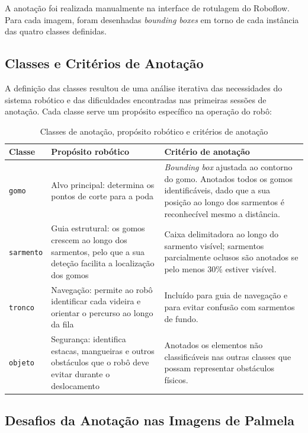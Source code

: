 A anotação foi realizada manualmente na interface de rotulagem do Roboflow.
Para cada imagem, foram desenhadas \textit{bounding boxes} em torno de cada
instância das quatro classes definidas.

\subsection{Classes e Critérios de Anotação}

A definição das classes resultou de uma análise iterativa das necessidades
do sistema robótico e das dificuldades encontradas nas primeiras sessões de
anotação. Cada classe serve um propósito específico na operação do robô:

\begin{table}[H]
  \centering
  \caption{Classes de anotação, propósito robótico e critérios de anotação}
  \label{tab:classes}
  \begin{tabularx}{\textwidth}{l p{3.8cm} X}
    \toprule
    \textbf{Classe}    & \textbf{Propósito robótico}     & \textbf{Critério de anotação} \\
    \midrule
    \texttt{gomo}      & Alvo principal: determina os pontos de corte para a poda & \textit{Bounding box} ajustada ao contorno do gomo. Anotados todos os gomos identificáveis, dado que a sua posição ao longo dos sarmentos é reconhecível mesmo a distância. \\[0.4em]
    \texttt{sarmento}  & Guia estrutural: os gomos crescem ao longo dos sarmentos, pelo que a sua deteção facilita a localização dos gomos & Caixa delimitadora ao longo do sarmento visível; sarmentos parcialmente oclusos são anotados se pelo menos 30\% estiver visível. \\[0.4em]
    \texttt{tronco}    & Navegação: permite ao robô identificar cada videira e orientar o percurso ao longo da fila & Incluído para guia de navegação e para evitar confusão com sarmentos de fundo. \\[0.4em]
    \texttt{objeto}    & Segurança: identifica estacas, mangueiras e outros obstáculos que o robô deve evitar durante o deslocamento & Anotados os elementos não classificáveis nas outras classes que possam representar obstáculos físicos. \\
    \bottomrule
  \end{tabularx}
\end{table}

\subsection{Desafios da Anotação nas Imagens de Palmela}

